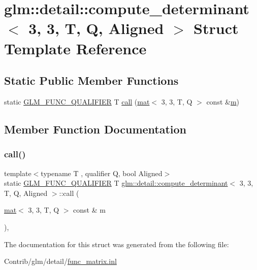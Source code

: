 \hypertarget{structglm_1_1detail_1_1compute__determinant_3_013_00_013_00_01_t_00_01_q_00_01_aligned_01_4}{}\section{glm\+:\+:detail\+:\+:compute\+\_\+determinant$<$ 3, 3, T, Q, Aligned $>$ Struct Template Reference}
\label{structglm_1_1detail_1_1compute__determinant_3_013_00_013_00_01_t_00_01_q_00_01_aligned_01_4}
\subsection*{Static Public Member Functions}
\begin{DoxyCompactItemize}
\item 
static \mbox{\hyperlink{setup_8hpp_a33fdea6f91c5f834105f7415e2a64407}{G\+L\+M\+\_\+\+F\+U\+N\+C\+\_\+\+Q\+U\+A\+L\+I\+F\+I\+ER}} T \mbox{\hyperlink{structglm_1_1detail_1_1compute__determinant_3_013_00_013_00_01_t_00_01_q_00_01_aligned_01_4_a768a144449ee7bbf69cdefe9896f1ceb}{call}} (\mbox{\hyperlink{structglm_1_1mat}{mat}}$<$ 3, 3, T, Q $>$ const \&\mbox{\hyperlink{_s_d_l__opengl__glext_8h_af593500c283bf1a787a6f947f503a5c2}{m}})
\end{DoxyCompactItemize}


\subsection{Member Function Documentation}
\mbox{\label{structglm_1_1detail_1_1compute__determinant_3_013_00_013_00_01_t_00_01_q_00_01_aligned_01_4_a768a144449ee7bbf69cdefe9896f1ceb}} 
\subsubsection{\texorpdfstring{call()}{call()}}
{\footnotesize\ttfamily template$<$typename T , qualifier Q, bool Aligned$>$ \\
static \mbox{\hyperlink{setup_8hpp_a33fdea6f91c5f834105f7415e2a64407}{G\+L\+M\+\_\+\+F\+U\+N\+C\+\_\+\+Q\+U\+A\+L\+I\+F\+I\+ER}} T \mbox{\hyperlink{structglm_1_1detail_1_1compute__determinant}{glm\+::detail\+::compute\+\_\+determinant}}$<$ 3, 3, T, Q, Aligned $>$\+::call (\begin{DoxyParamCaption}\item[{\mbox{\hyperlink{structglm_1_1mat}{mat}}$<$ 3, 3, T, Q $>$ const \&}]{m }\end{DoxyParamCaption})\hspace{0.3cm}{\ttfamily [inline]}, {\ttfamily [static]}}



The documentation for this struct was generated from the following file\+:\begin{DoxyCompactItemize}
\item 
Contrib/glm/detail/\mbox{\hyperlink{func__matrix_8inl}{func\+\_\+matrix.\+inl}}\end{DoxyCompactItemize}
